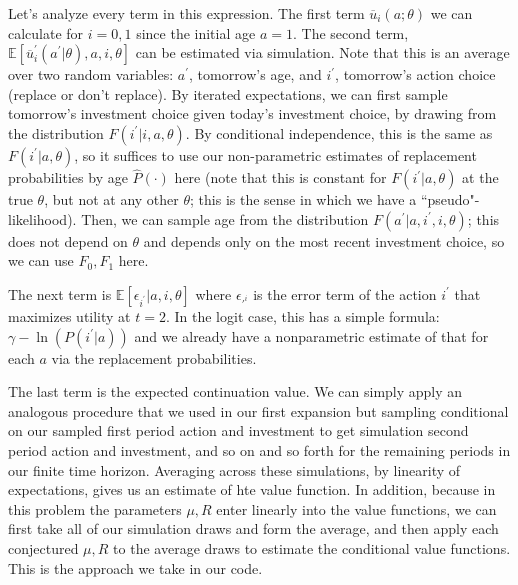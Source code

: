 \documentclass{article}
\begin{document}
\begin{enumerate}
\begin{enumerate}
\begin{enumerate}
\begin{answer}
Let's analyze every term in this expression. The first term $\overline{u}_i(a;\theta)$ we can calculate for $i=0,1$ since the initial age $a=1$. The second term, $\mathbb{E}[\overline{u}_i^\prime(a^\prime|\theta), a, i , \theta]$ can be estimated via simulation. Note that this is an average over two random variables: $a^\prime$, tomorrow's age, and $i^\prime$, tomorrow's action choice (replace or don't replace). By iterated expectations, we can first sample tomorrow's investment choice given today's investment choice, by drawing from the distribution $F(i^\prime |i,a,\theta)$. By conditional independence, this is the same as $F(i^\prime |a,\theta)$, so it suffices to use our non-parametric estimates of replacement probabilities by age $\hat{P}(\cdot)$ here (note that this is constant for  $F(i^\prime |a,\theta)$ at the true $\theta$, but not at any other $\theta$; this is the sense in which we have a ``pseudo"-likelihood). Then, we can sample age from the distribution $F(a^\prime |a,i^\prime, i,\theta)$; this does not depend on $\theta$ and depends only on the most recent investment choice, so we can use $F_0,F_1$ here.  

The next term is $\mathbb{E}[\epsilon_{i^\prime}|a,i,\theta]$ where $\epsilon_{\prime^i}$ is the error term of the action $i^\prime$ that maximizes utility at $t=2$. In the logit case, this has a simple formula: $\gamma - \ln(P(i^\prime|a))$ and we already have a nonparametric estimate of that for each $a$ via the replacement probabilities.

The last term is the expected continuation value. We can simply apply an analogous procedure that we used in our first expansion but sampling conditional on our sampled first period action and investment to get simulation second period action and investment, and so on and so forth for the remaining periods in our finite time horizon. Averaging across these simulations, by linearity of expectations, gives us an estimate of hte value function. In addition, because in this problem the parameters $\mu, R$ enter linearly into the value functions, we can first take all of our simulation draws and form the average, and then apply each conjectured $\mu, R$ to the average draws to estimate the conditional value functions. This is the approach we take in our code. 


\end{answer}
\end{enumerate}
\end{enumerate}
\end{enumerate}
\end{document}
